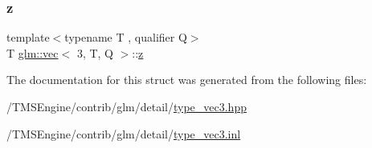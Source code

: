 \subsubsection{\texorpdfstring{z}{z}}
{\footnotesize\ttfamily template$<$typename T , qualifier Q$>$ \\
T \hyperlink{structglm_1_1vec}{glm\+::vec}$<$ 3, T, Q $>$\+::\hyperlink{_s_d_l__opengl__glext_8h_a5e74030ebb3297ce1b37ff716fedd68f}{z}}



The documentation for this struct was generated from the following files\+:\begin{DoxyCompactItemize}
\item 
/\+T\+M\+S\+Engine/contrib/glm/detail/\hyperlink{type__vec3_8hpp}{type\+\_\+vec3.\+hpp}\item 
/\+T\+M\+S\+Engine/contrib/glm/detail/\hyperlink{type__vec3_8inl}{type\+\_\+vec3.\+inl}\end{DoxyCompactItemize}

